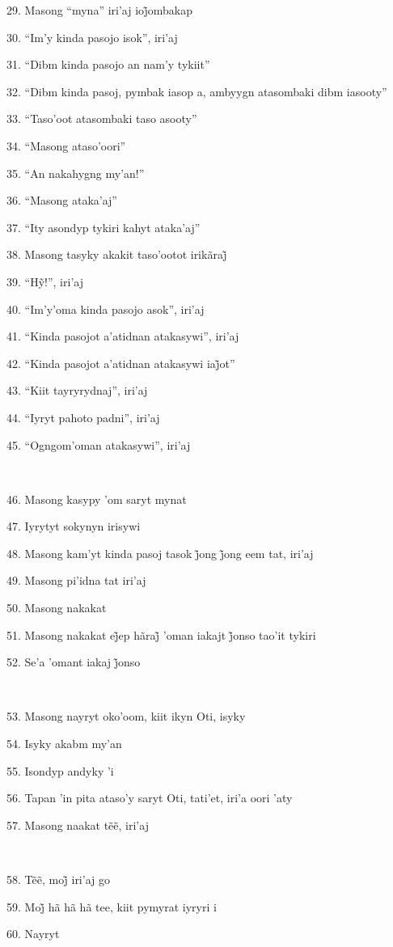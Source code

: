 29. Masong ``myna'' iri’aj ioj̃ombakap

30. ``Im'y kinda pasojo isok'', iri'aj

31. ``Dibm kinda pasojo an nam'y tykiit''

32. ``Dibm kinda pasoj, pymbak iasop a, ambyygn atasombaki dibm iasooty''

33. ``Taso'oot atasombaki taso asooty''

34. ``Masong ataso'oori''

35. ``An nakahygng my'an!''

36. ``Masong ataka'aj''

37. ``Ity asondyp tykiri kahyt ataka'aj''

38. Masong tasyky akakit taso’ootot irikãraj̃

39. ``Hỹ!'', iri’aj

40. ``Im'y'oma kinda pasojo asok'', iri'aj

41. ``Kinda pasojot a'atidnan atakasywi'', iri'aj

42. ``Kinda pasojot a’atidnan atakasywi iaj̃ot''

43. ``Kiit tayryrydnaj'', iri'aj

44. ``Iyryt pahoto padni'', iri'aj

45. ``Ogngom'oman atakasywi'', iri'aj

~

46. Masong kasypy 'om saryt mynat

47. Iyrytyt sokynyn irisywi

48. Masong kam’yt kinda pasoj tasok j̃ong j̃ong eem tat, iri’aj

49. Masong pi'idna tat iri'aj

50. Masong nakakat

51. Masong nakakat ej̃ep hãraj̃ ’oman iakajt j̃onso tao’it tykiri

52. Se’a ’omant iakaj j̃onso

~

53. Masong nayryt oko'oom, kiit ikyn Oti, isyky

54. Isyky akabm my'an

55. Isondyp andyky 'i

56. Tapan 'in pita ataso'y saryt Oti, tati'et, iri'a oori 'aty

57. Masong naakat tẽẽ, iri’aj

~

58. Tẽẽ, moj̃ iri’aj go

59. Moj̃ hã hã hã tee, kiit pymyrat iyryri i

60. Nayryt

